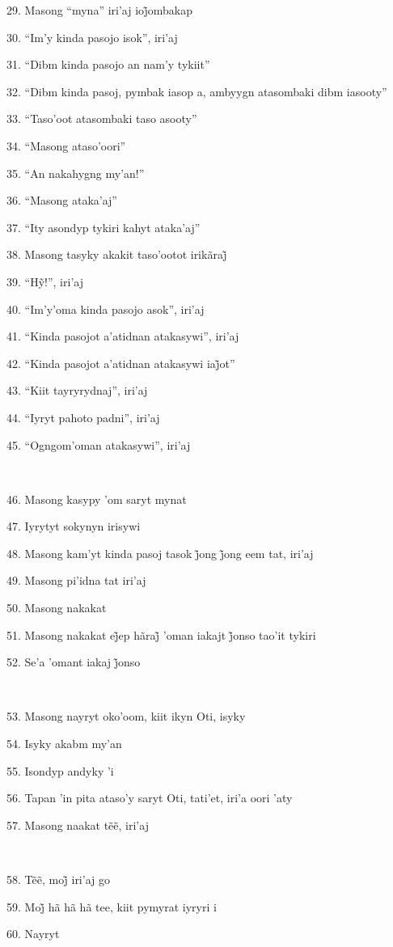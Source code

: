 29. Masong ``myna'' iri’aj ioj̃ombakap

30. ``Im'y kinda pasojo isok'', iri'aj

31. ``Dibm kinda pasojo an nam'y tykiit''

32. ``Dibm kinda pasoj, pymbak iasop a, ambyygn atasombaki dibm iasooty''

33. ``Taso'oot atasombaki taso asooty''

34. ``Masong ataso'oori''

35. ``An nakahygng my'an!''

36. ``Masong ataka'aj''

37. ``Ity asondyp tykiri kahyt ataka'aj''

38. Masong tasyky akakit taso’ootot irikãraj̃

39. ``Hỹ!'', iri’aj

40. ``Im'y'oma kinda pasojo asok'', iri'aj

41. ``Kinda pasojot a'atidnan atakasywi'', iri'aj

42. ``Kinda pasojot a’atidnan atakasywi iaj̃ot''

43. ``Kiit tayryrydnaj'', iri'aj

44. ``Iyryt pahoto padni'', iri'aj

45. ``Ogngom'oman atakasywi'', iri'aj

~

46. Masong kasypy 'om saryt mynat

47. Iyrytyt sokynyn irisywi

48. Masong kam’yt kinda pasoj tasok j̃ong j̃ong eem tat, iri’aj

49. Masong pi'idna tat iri'aj

50. Masong nakakat

51. Masong nakakat ej̃ep hãraj̃ ’oman iakajt j̃onso tao’it tykiri

52. Se’a ’omant iakaj j̃onso

~

53. Masong nayryt oko'oom, kiit ikyn Oti, isyky

54. Isyky akabm my'an

55. Isondyp andyky 'i

56. Tapan 'in pita ataso'y saryt Oti, tati'et, iri'a oori 'aty

57. Masong naakat tẽẽ, iri’aj

~

58. Tẽẽ, moj̃ iri’aj go

59. Moj̃ hã hã hã tee, kiit pymyrat iyryri i

60. Nayryt

